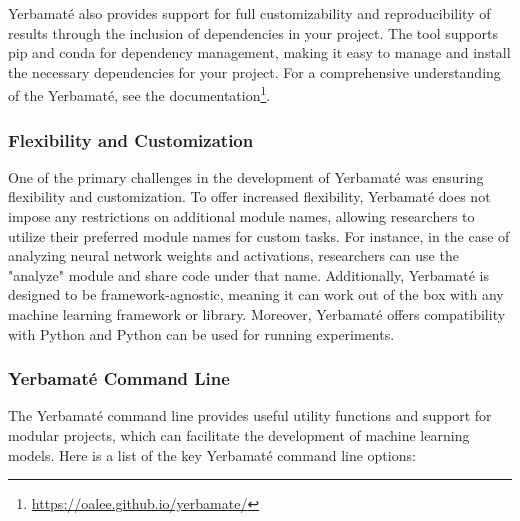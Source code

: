 \documentclass{IEEEtran}
\begin{document}
Yerbamaté also provides support for full customizability and reproducibility of results through the inclusion of dependencies in your project. The tool supports pip and conda for dependency management, making it easy to manage and install the necessary dependencies for your project.
For a comprehensive understanding of the Yerbamaté, see the documentation\footnote{\url{https://oalee.github.io/yerbamate/}}.


\subsubsection{Flexibility and Customization}
One of the primary challenges in the development of Yerbamaté was ensuring flexibility and customization.
To offer increased flexibility, Yerbamaté does not impose any restrictions on additional module names, allowing researchers to utilize their preferred module names for custom tasks. For instance, in the case of analyzing neural network weights and activations, researchers can use the "analyze" module and share code under that name.  Additionally, Yerbamaté is designed to be framework-agnostic, meaning it can work out of the box with any machine learning framework or library.  Moreover, Yerbamaté offers compatibility with Python and Python can be used for running experiments. 

\subsubsection{Yerbamaté Command Line}
The Yerbamaté command line provides useful utility functions and support for modular projects, which can facilitate the development of machine learning models.
Here is a list of the key Yerbamaté command line options:
\end{document}
